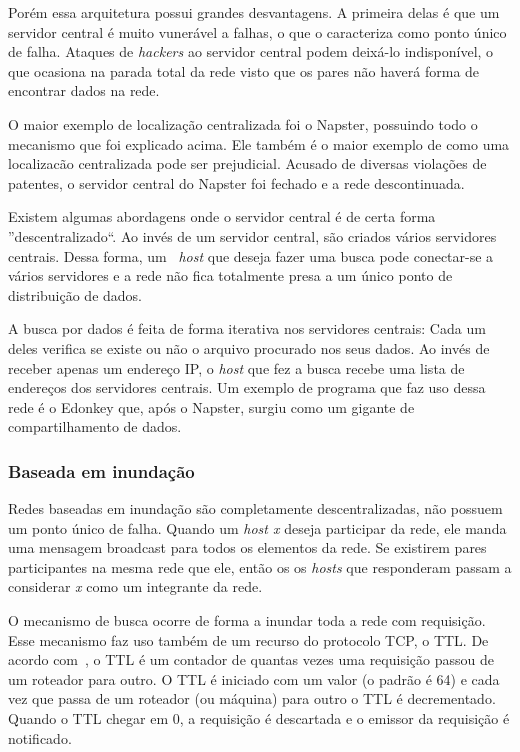 Porém essa arquitetura possui grandes desvantagens. A primeira delas é que um servidor central é muito vunerável a falhas, o que o caracteriza como ponto único de falha. Ataques de \emph{hackers} ao servidor central podem deixá-lo indisponível, o que ocasiona na parada total da rede visto que os pares não haverá forma de encontrar dados na rede.

O maior exemplo de localização centralizada foi o Napster, possuindo todo o mecanismo que foi explicado acima. Ele também é o maior exemplo de como uma localizacão centralizada pode ser prejudicial. Acusado de diversas violações de patentes, o servidor central do Napster foi fechado e a rede descontinuada.

Existem algumas abordagens onde o servidor central é de certa forma ''descentralizado``. Ao invés de um servidor central, são criados vários servidores centrais. Dessa forma, um ~\emph{host} que deseja fazer uma busca pode conectar-se a vários servidores e a rede não fica totalmente presa a um único ponto de distribuição de dados.

A busca por dados é feita de forma iterativa nos servidores centrais: Cada um deles verifica se existe ou não o arquivo procurado nos seus dados. Ao invés de receber apenas um endereço IP, o \emph{host} que fez a busca recebe uma lista de endereços dos servidores centrais.
Um exemplo de programa que faz uso dessa rede é o Edonkey que, após o Napster, surgiu como um gigante de compartilhamento de dados.

\subsubsection{Baseada em inundação}

Redes baseadas em inundação são completamente descentralizadas, não possuem um ponto único de falha. Quando um \emph{host x} deseja participar da rede, ele manda uma mensagem broadcast para todos os elementos da rede. Se existirem pares participantes na mesma rede que ele, então os os \emph{hosts} que responderam passam a considerar \emph{x} como um integrante da rede.

O mecanismo de busca ocorre de forma a inundar toda a rede com requisição. Esse mecanismo faz uso também de um recurso do protocolo TCP, o TTL. De acordo com~\cite{stevens93}, o TTL é um contador de quantas vezes uma requisição passou de um roteador para outro. O TTL é iniciado com um valor (o padrão é 64) e cada vez que passa de um roteador (ou máquina) para outro o TTL é decrementado. Quando o TTL chegar em 0, a requisição é descartada e o emissor da requisição é notificado.

